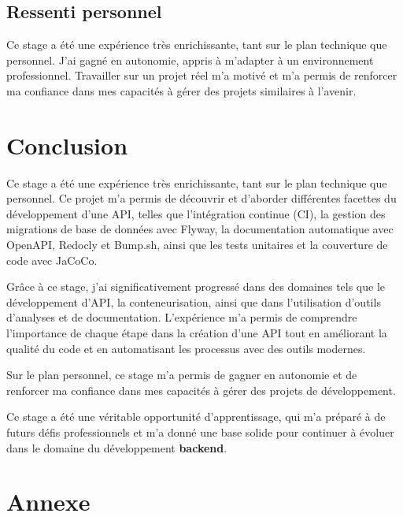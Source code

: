 \documentclass[11pt]{article}
\begin{document}
		\subsection*{Ressenti personnel}
		
		Ce stage a été une expérience très enrichissante, tant sur le plan technique que personnel. J'ai gagné en autonomie, appris à m'adapter à un environnement professionnel. Travailler sur un projet réel m'a motivé et m'a permis de renforcer ma confiance dans mes capacités à gérer des projets similaires à l'avenir.
		
	\section{Conclusion}
	
	Ce stage a été une expérience très enrichissante, tant sur le plan technique que personnel. Ce projet m'a permis de découvrir et d’aborder différentes facettes du développement d'une API, telles que l'intégration continue (CI), la gestion des migrations de base de données avec Flyway, la documentation automatique avec OpenAPI, Redocly et Bump.sh, ainsi que les tests unitaires et la couverture de code avec JaCoCo.
	
	\vspace{0.2cm}
	
	Grâce à ce stage, j’ai significativement progressé dans des domaines tels que le développement d'API, la conteneurisation, ainsi que dans l’utilisation d’outils d'analyses et de documentation. L'expérience m’a permis de comprendre l’importance de chaque étape dans la création d’une API tout en améliorant la qualité du code et en automatisant les processus avec des outils modernes.
	
	\vspace{0.2cm}
	
	Sur le plan personnel, ce stage m’a permis de gagner en autonomie et de renforcer ma confiance dans mes capacités à gérer des projets de développement.
	
	\vspace{0.2cm}
	
	Ce stage a été une véritable opportunité d’apprentissage, qui m’a préparé à de futurs défis professionnels et m’a donné une base solide pour continuer à évoluer dans le domaine du développement \textbf{backend}.


		
		\newpage
		\section{Annexe}
\end{document}
